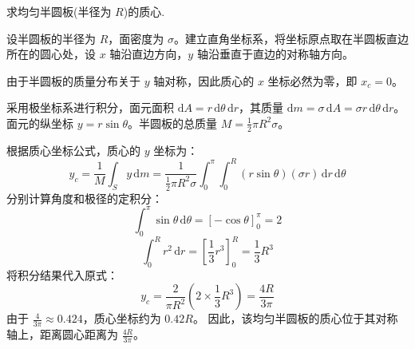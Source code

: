 \begin{exercise}\label{ex:5.1}
求均匀半圆板(半径为 $R$)的质心.
\end{exercise}
\begin{solution}
设半圆板的半径为 $R$，面密度为 $\sigma$。建立直角坐标系，将坐标原点取在半圆板直边所在的圆心处，设 $x$ 轴沿直边方向，$y$ 轴沿垂直于直边的对称轴方向。

由于半圆板的质量分布关于 $y$ 轴对称，因此质心的 $x$ 坐标必然为零，即 $x_c = 0$。

采用极坐标系进行积分，面元面积 $\mathrm{d}A = r \, \mathrm{d}\theta \, \mathrm{d}r$，其质量 $\mathrm{d}m = \sigma \, \mathrm{d}A = \sigma r \, \mathrm{d}\theta \, \mathrm{d}r$。面元的纵坐标 $y = r \sin\theta$。半圆板的总质量 $M = \frac{1}{2} \pi R^2 \sigma$。

根据质心坐标公式，质心的 $y$ 坐标为：
$$ y_c = \frac{1}{M} \int_S y \, \mathrm{d}m = \frac{1}{\frac{1}{2} \pi R^2 \sigma} \int_0^\pi \int_0^R (r \sin\theta) (\sigma r) \, \mathrm{d}r \, \mathrm{d}\theta $$
分别计算角度和极径的定积分：
$$ \int_0^\pi \sin\theta \, \mathrm{d}\theta = [-\cos\theta]_0^\pi = 2 $$
$$ \int_0^R r^2 \, \mathrm{d}r = \left[ \frac{1}{3} r^3 \right]_0^R = \frac{1}{3} R^3 $$
将积分结果代入原式：
$$ y_c = \frac{2}{\pi R^2} \left( 2 \times \frac{1}{3} R^3 \right) = \frac{4R}{3\pi} $$
由于 $\frac{4}{3\pi} \approx 0.424$，质心坐标约为 $0.42R$。
因此，该均匀半圆板的质心位于其对称轴上，距离圆心距离为 $\frac{4R}{3\pi}$。
\end{solution}

